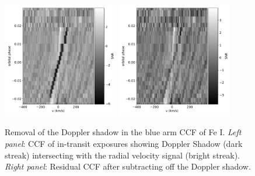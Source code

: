 \documentclass[twocolumn]{aastex631}
\begin{document}
            \begin{figure}
                \centering
                \includegraphics[width=0.45\textwidth]{plots/raw-ccf-before/KELT-20b.20190504.Fe.blue.CCFs-raw.pdf}
                \hspace{0.05\textwidth}
                \includegraphics[width=0.45\textwidth]{plots/raw-ccf-after/KELT-20b.20190504.Fe.blue.CCFs-raw.pdf}
                \caption{Removal of the Doppler shadow in the blue arm CCF of Fe I. \textit{Left panel}: CCF of in-transit exposures showing Doppler Shadow (dark streak) intersecting with the radial velocity signal (bright streak). \textit{Right panel}: Residual CCF after subtracting off the Doppler shadow.}
                \label{fig:raw-CCFs}
            \end{figure}
            
            
            
\end{document}

